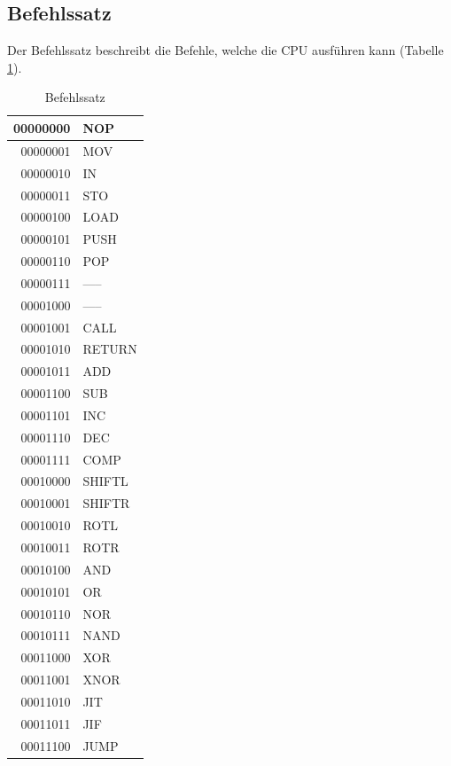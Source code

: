 \documentclass[a4paper,12pt]{article}
\begin{document}
\subsection{Befehlssatz}

Der Befehlssatz beschreibt die Befehle, welche die CPU ausführen kann (Tabelle \ref{tab:befehlssatz}).
\newpage
\begin{table}[!htb]
\centering
\begin{tabular}{|r|l|}
  \hline
  00000000 & NOP \\
  \hline
  00000001 & MOV\\ 
  \hline
  00000010 & IN\\
  \hline
  00000011 & STO\\
  \hline
  00000100 & LOAD\\
  \hline
  00000101 & PUSH \\ 
  \hline
  00000110 & POP\\
  \hline
  00000111 & -----\\
 \hline
  00001000 & ----- \\
  \hline
  00001001 & CALL\\ 
  \hline
  00001010 & RETURN\\
  \hline
  00001011 & ADD\\
  \hline 
 00001100 & SUB \\
  \hline
  00001101 & INC\\ 
  \hline
  00001110 & DEC\\
  \hline
  00001111 & COMP\\
  \hline
  00010000 & SHIFTL\\
  \hline
  00010001 & SHIFTR\\ 
  \hline
  00010010 & ROTL\\
  \hline
  00010011 & ROTR\\
  \hline
  00010100 & AND\\
  \hline
  00010101 & OR \\ 
  \hline
  00010110 & NOR\\
  \hline
  00010111 & NAND\\
  \hline
  00011000 & XOR\\
  \hline
  00011001 & XNOR \\
  \hline
  00011010 & JIT\\
  \hline
  00011011 & JIF\\
  \hline
  00011100 & JUMP\\
  \hline
\end{tabular}
\caption{Befehlssatz}
\label{tab:befehlssatz}
\end{table}
\end{document}
